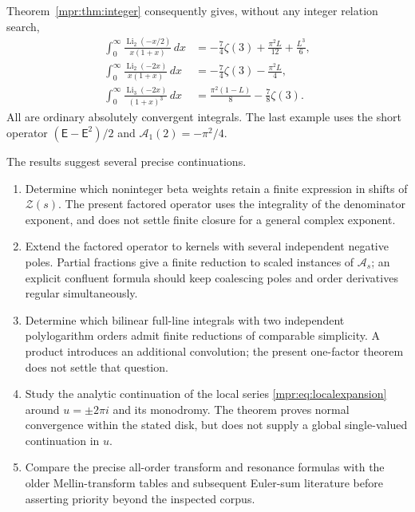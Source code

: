 Theorem~\ref{mpr:thm:integer} consequently gives, without any integer
relation search,
\begin{align}
 \int_0^\infty\frac{\operatorname{Li}_2(-x/2)}{x(1+x)}\,dx
       &=-\frac74\zeta(3)+\frac{\pi^2L}{12}+\frac{L^3}{6},
             \label{mpr:eq:ex1}\\
 \int_0^\infty\frac{\operatorname{Li}_2(-2x)}{x(1+x)}\,dx
       &=-\frac74\zeta(3)-\frac{\pi^2L}{4},
             \label{mpr:eq:ex2}\\
 \int_0^\infty\frac{\operatorname{Li}_3(-2x)}{(1+x)^3}\,dx
       &=\frac{\pi^2(1-L)}8-\frac78\zeta(3).
             \label{mpr:eq:ex3}
\end{align}
All are ordinary absolutely convergent integrals.  The last example
uses the short operator $(\mathsf E-\mathsf E^2)/2$ and
$\mathcal A_1(2)=-\pi^2/4$.

The results suggest several precise continuations.
\begin{enumerate}
\item Determine which noninteger beta weights retain a finite expression
in shifts of $\mathscr Z(s)$.  The present factored operator uses the
integrality of the denominator exponent, and does not settle finite
closure for a general complex exponent.
\item Extend the factored operator to kernels with several independent
negative poles.  Partial fractions give a finite reduction to scaled
instances of $\mathcal A_s$; an explicit confluent formula should keep
coalescing poles and order derivatives regular simultaneously.
\item Determine which bilinear full-line integrals with two independent
polylogarithm orders admit finite reductions of comparable simplicity.
A product introduces an additional convolution; the present one-factor
theorem does not settle that question.
\item Study the analytic continuation of the local series
\eqref{mpr:eq:localexpansion} around $u=\pm2\pi i$ and its monodromy.
The theorem proves normal convergence within the stated disk, but does
not supply a global single-valued continuation in $u$.
\item Compare the precise all-order transform and resonance formulas with
the older Mellin-transform tables and subsequent Euler-sum literature
before asserting priority beyond the inspected corpus.
\end{enumerate}
